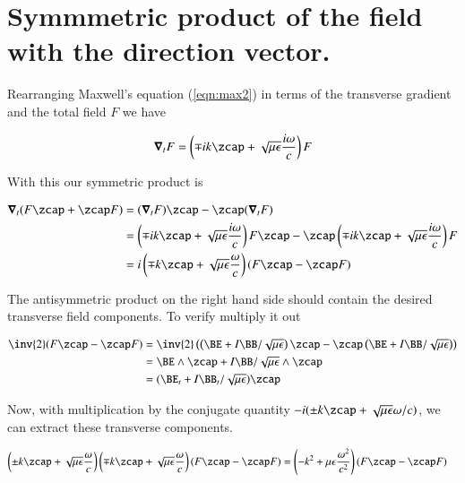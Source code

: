 \section{Symmmetric product of the field with the direction vector.}

Rearranging Maxwell's equation (\ref{eqn:max2}) in terms of the transverse gradient and the total field $F$ we have

\begin{align}
\spacegrad_t F = \left( \mp i k \zcap + \sqrt{\mu\epsilon}\frac{i\omega}{c}\right) F
\end{align}

With this our symmetric product is

\begin{align*}
\spacegrad_t ( F \zcap + \zcap F) 
&= (\spacegrad_t F) \zcap - \zcap (\spacegrad_t F) \\
&=
\left( \mp i k \zcap + \sqrt{\mu\epsilon}\frac{i\omega}{c}\right) F \zcap
- \zcap \left( \mp i k \zcap + \sqrt{\mu\epsilon}\frac{i\omega}{c}\right) F \\
&=
i \left( \mp k \zcap + \sqrt{\mu\epsilon}\frac{\omega}{c}\right) (F \zcap - \zcap F) \\
\end{align*}

The antisymmetric product on the right hand side should contain the desired transverse field components.  To verify multiply it out

\begin{align*}
\inv{2}(F \zcap - \zcap F)  
&=
\inv{2}\left( \left(\BE + I \BB/\sqrt{\mu\epsilon}\right) \zcap - \zcap \left(\BE + I \BB/\sqrt{\mu\epsilon}\right) \right)  \\
&=
\BE \wedge \zcap + I \BB/\sqrt{\mu\epsilon} \wedge \zcap \\
&=
(\BE_t + I \BB_t/\sqrt{\mu\epsilon}) \zcap \\
\end{align*}

Now, with multiplication by the conjugate quantity $-i(\pm k \zcap + \sqrt{\mu\epsilon}\omega/c)$, we can extract these transverse components.

\begin{align*}
\left( \pm k \zcap + \sqrt{\mu\epsilon}\frac{\omega}{c}\right) \left( \mp k \zcap + \sqrt{\mu\epsilon}\frac{\omega}{c}\right) (F \zcap - \zcap F) &=
\left( -k^2 + {\mu\epsilon}\frac{\omega^2}{c^2}\right) (F \zcap - \zcap F) 
\end{align*}

